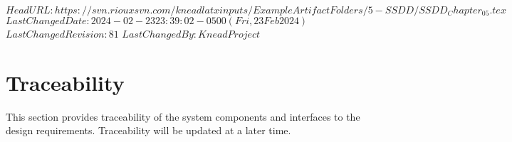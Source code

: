 \svnidlong
{$HeadURL: https://svn.riouxsvn.com/kneadlatxinputs/ExampleArtifactFolders/5-SSDD/SSDD_Chapter_05.tex $}
{$LastChangedDate: 2024-02-23 23:39:02 -0500 (Fri, 23 Feb 2024) $}
{$LastChangedRevision: 81 $}
{$LastChangedBy: KneadProject $}


\chapter{Traceability}
\label{loc:Traceability}

This section provides traceability of the system components and interfaces to the design requirements. Traceability will be updated at a later time.
